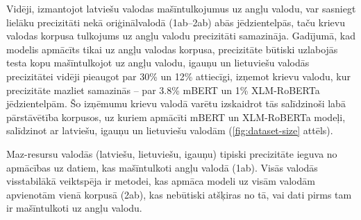 

Vidēji, izmantojot latviešu valodas mašīntulkojumus uz angļu valodu, var sasniegt lielāku precizitāti nekā oriģinālvalodā (1ab--2ab) abās jēdzientelpās, taču krievu valodas korpusa tulkojums uz angļu valodu precizitāti samazināja. Gadījumā, kad modelis apmācīts tikai uz angļu valodas korpusa, precizitāte būtiski uzlabojās testa kopu mašīntulkojot uz angļu valodu, igauņu un lietuviešu valodās precizitātei vidēji pieaugot par 30\% un 12\% attiecīgi, izņemot krievu valodu, kur precizitāte mazliet samazinās -- par 3.8\% mBERT un 1\% XLM-RoBERTa jēdzientelpām. Šo izņēmumu krievu valodā varētu izskaidrot tās salīdzinoši labā pārstāvētība korpusos, uz kuriem apmācīti mBERT un XLM-RoBERTa modeļi, salīdzinot ar latviešu, igauņu un lietuviešu valodām (\ref{fig:dataset-size} attēls).



Maz-resursu valodās (latviešu, lietuviešu, igauņu) tipiski precizitāte ieguva no apmācības uz datiem, kas mašīntulkoti angļu valodā (1ab). Visās valodās visstabilākā veiktspēja ir metodei, kas apmāca modeli uz visām valodām apvienotām vienā korpusā (2ab), kas nebūtiski atšķiras no tā, vai dati pirms tam ir mašīntulkoti uz angļu valodu.


